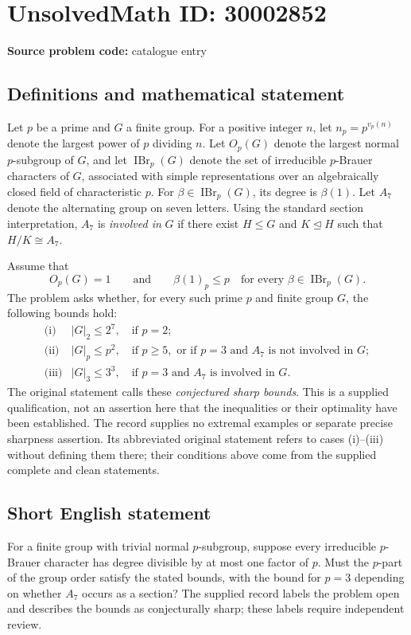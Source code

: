 \documentclass[11pt]{article}
\begin{document}
\section*{UnsolvedMath ID: 30002852}
\textbf{Source problem code:} catalogue entry
\subsection{Definitions and mathematical statement}
Let \(p\) be a prime and \(G\) a finite group. For a positive integer \(n\), let \(n_p=p^{v_p(n)}\) denote the largest power of \(p\) dividing \(n\). Let \(O_p(G)\) denote the largest normal \(p\)-subgroup of \(G\), and let \(\operatorname{IBr}_p(G)\) denote the set of irreducible \(p\)-Brauer characters of \(G\), associated with simple representations over an algebraically closed field of characteristic \(p\). For \(\beta\in\operatorname{IBr}_p(G)\), its degree is \(\beta(1)\). Let \(A_7\) denote the alternating group on seven letters. Using the standard section interpretation, \(A_7\) is \emph{involved in} \(G\) if there exist \(H\leq G\) and \(K\trianglelefteq H\) such that \(H/K\cong A_7\).

Assume that
\[
O_p(G)=1
\qquad\text{and}\qquad
\beta(1)_p\leq p\quad\text{for every }\beta\in\operatorname{IBr}_p(G).
\]
The problem asks whether, for every such prime \(p\) and finite group \(G\), the following bounds hold:
\[
\begin{array}{ll}
\text{(i)} & |G|_2\leq 2^7,\quad\text{if }p=2;\\[2pt]
\text{(ii)} & |G|_p\leq p^2,\quad\text{if }p\geq5,\text{ or if }p=3\text{ and }A_7\text{ is not involved in }G;\\[2pt]
\text{(iii)} & |G|_3\leq 3^3,\quad\text{if }p=3\text{ and }A_7\text{ is involved in }G.
\end{array}
\]
The original statement calls these \emph{conjectured sharp bounds}. This is a supplied qualification, not an assertion here that the inequalities or their optimality have been established. The record supplies no extremal examples or separate precise sharpness assertion. Its abbreviated original statement refers to cases (i)--(iii) without defining them there; their conditions above come from the supplied complete and clean statements.
\subsection{Short English statement}
For a finite group with trivial normal \(p\)-subgroup, suppose every irreducible \(p\)-Brauer character has degree divisible by at most one factor of \(p\). Must the \(p\)-part of the group order satisfy the stated bounds, with the bound for \(p=3\) depending on whether \(A_7\) occurs as a section? The supplied record labels the problem open and describes the bounds as conjecturally sharp; these labels require independent review.
\end{document}
